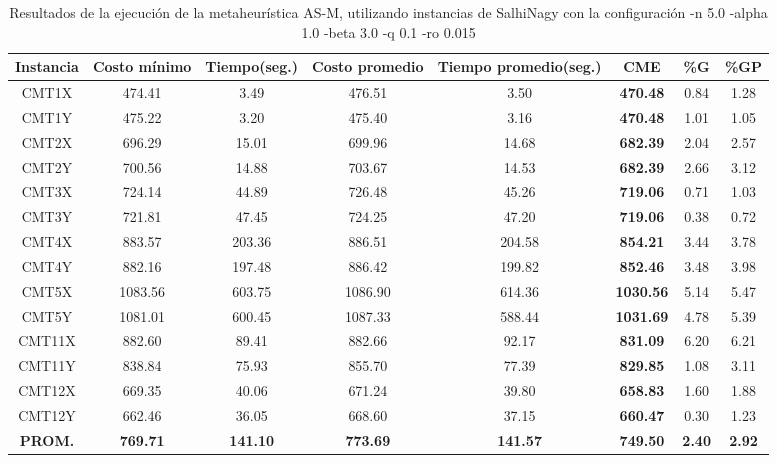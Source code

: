 \begin{table}[h]
\caption{Resultados de la ejecución de la metaheurística AS-M, utilizando instancias de SalhiNagy con la configuración -n 5.0 -alpha 1.0 -beta 3.0 -q 0.1 -ro 0.015}
\centering
\small
\begin{tabular}{c c c c c c c c}
\hline\hline
Instancia & Costo mínimo & Tiempo(seg.) & Costo promedio & Tiempo promedio(seg.) & CME & \%G & \%GP \\ [0.5ex]
\hline
CMT1X & 474.41 & 3.49 & 
476.51 & 3.50 & \bf{470.48} & 
0.84 & 1.28\\CMT1Y & 475.22 & 3.20 & 
475.40 & 3.16 & \bf{470.48} & 
1.01 & 1.05\\CMT2X & 696.29 & 15.01 & 
699.96 & 14.68 & \bf{682.39} & 
2.04 & 2.57\\CMT2Y & 700.56 & 14.88 & 
703.67 & 14.53 & \bf{682.39} & 
2.66 & 3.12\\CMT3X & 724.14 & 44.89 & 
726.48 & 45.26 & \bf{719.06} & 
0.71 & 1.03\\CMT3Y & 721.81 & 47.45 & 
724.25 & 47.20 & \bf{719.06} & 
0.38 & 0.72\\CMT4X & 883.57 & 203.36 & 
886.51 & 204.58 & \bf{854.21} & 
3.44 & 3.78\\CMT4Y & 882.16 & 197.48 & 
886.42 & 199.82 & \bf{852.46} & 
3.48 & 3.98\\CMT5X & 1083.56 & 603.75 & 
1086.90 & 614.36 & \bf{1030.56} & 
5.14 & 5.47\\CMT5Y & 1081.01 & 600.45 & 
1087.33 & 588.44 & \bf{1031.69} & 
4.78 & 5.39\\CMT11X & 882.60 & 89.41 & 
882.66 & 92.17 & \bf{831.09} & 
6.20 & 6.21\\CMT11Y & 838.84 & 75.93 & 
855.70 & 77.39 & \bf{829.85} & 
1.08 & 3.11\\CMT12X & 669.35 & 40.06 & 
671.24 & 39.80 & \bf{658.83} & 
1.60 & 1.88\\CMT12Y & 662.46 & 36.05 & 
668.60 & 37.15 & \bf{660.47} & 
0.30 & 1.23\\\bf{PROM.} & 
\bf{769.71} & \bf{141.10} & \bf{773.69} & \bf{141.57} & \bf{749.50} & \bf{2.40} & \bf{2.92}\\[1ex]\hline
\end{tabular}
\label{table:nonlin}
\end{table}
